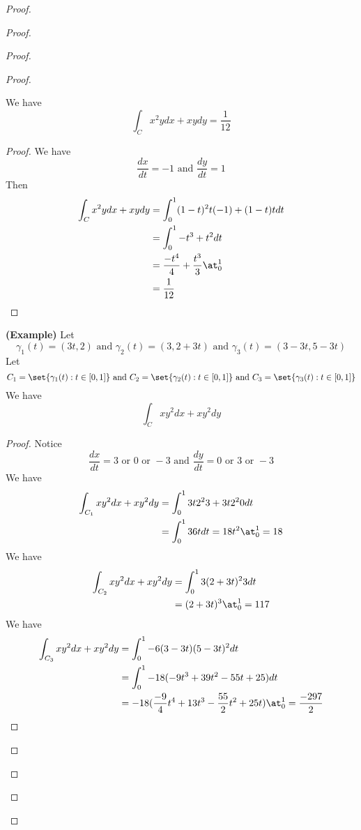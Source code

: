 \documentclass{report}
\begin{document}
\begin{proof}
\begin{proof}
\begin{proof}
\begin{proof}
\begin{theorem}
We have
\begin{equation}
\int_C x^2ydx+xydy=\frac{1}{12}
\end{equation}
\end{theorem}
\begin{proof}
We have
\begin{equation}
\frac{dx}{dt}=-1\text{ and }\frac{dy}{dt}=1
\end{equation}
Then
\begin{align}
\int_C x^2ydx+xydy&=\int_0^1 (1-t)^2t(-1)+(1-t)tdt\\
&=\int_0^1 -t^3+t^2dt\\
&=\frac{-t^4}{4}+\frac{t^3}{3}\at_{0}^1\\
&=\frac{1}{12}
\end{align}
\end{proof}
\begin{theorem}
\label{9.2.7}
\textbf{(Example)} Let
\begin{equation}
\gamma_1 (t)=(3t,2)\text{ and }\gamma _2(t)=(3,2+3t)\text{ and }\gamma _3(t)=(3-3t,5-3t)
\end{equation}
Let
 \begin{equation}
C_1=\set{\gamma _1(t):t\in[0,1]}\text{ and }C_2=\set{\gamma _2(t):t\in[0,1]}\text{ and }C_3=\set{\gamma _3(t):t\in[0,1]}
\end{equation}
We have
\begin{equation}
\int_C xy^2 dx+xy^2 dy 
\end{equation}
\end{theorem}
\begin{proof}
 Notice 
 \begin{equation}
 \frac{dx}{dt}=3\text{ or }0\text{ or }-3\text{ and }\frac{dy}{dt}=0\text{ or }3\text{ or }-3
 \end{equation}
We have
\begin{align}
\int_{C_1} xy^2 dx+xy^2dy&=\int_0^1 3t 2^2 3+3t 2^2 0 dt\\
&=\int_0^1 36t dt=18t^2 \at_{0}^1=18
\end{align}
We have
\begin{align}
\int_{C_2} xy^2dx+xy^2dy &=\int_0^1 3(2+3t)^2 3dt\\
&=(2+3t)^3 \at_{0}^1=117
\end{align}
We have
\begin{align}
\int_{C_3}xy^2 dx+xy^2dy&=\int_0^1 -6(3-3t)(5-3t)^2 dt\\
&=\int_0^1 -18(-9t^3+39t^2-55t+25)dt\\
&=-18 (\frac{-9}{4}t^4+13t^3-\frac{55}{2}t^2+25t) \at_{0}^1 =\frac{-297}{2}

\end{align}
\end{proof}
\end{proof}
\end{proof}
\end{proof}
\end{proof}
\end{document}
